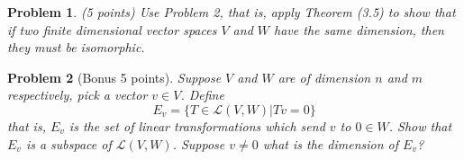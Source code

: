 \documentclass{article}
\theoremstyle{problemstyle}
\newtheorem{problem}{Problem}
\theoremstyle{problemstyle}
\newtheorem{solution}{Solution}
\theoremstyle{problemstyle}
\begin{document}
\begin{problem}
(5 points) Use Problem 2, that is, apply Theorem (3.5) to show that if two finite dimensional vector spaces $V$ and $W$ have the same dimension, then they must be isomorphic. 
\end{problem}


\begin{problem}[Bonus 5 points]
Suppose $V$ and $W$ are of dimension $n$ and $m$ respectively, pick a vector $v\in V$. Define $$E_v = \{T \in \mathscr{L}(V,W)|Tv = 0\}$$ that is, $E_v$ is the set of linear transformations which send $v$ to $0 \in W$. Show that $E_v$ is a subspace of $\mathscr{L}(V,W)$. Suppose $v \neq 0$ what is the dimension of $E_v$? 
\end{problem}

% 
% 
% 
% 
% 
% 
% 
\end{document}
